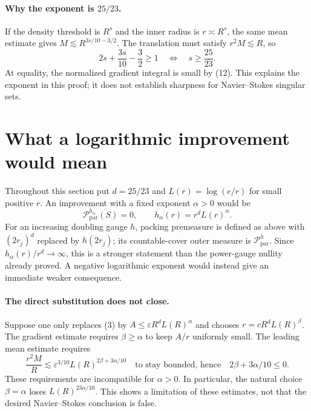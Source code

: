 \documentclass[11pt]{article}
\begin{document}
\paragraph{Why the exponent is $25/23$.}
If the density threshold is $R^s$ and the inner radius is $r\asymp R^s$, the same mean estimate gives $M\lesssim R^{3s/10-3/2}$. The translation must satisfy $r^2M\lesssim R$, so
$$
2s+\frac{3s}{10}-\frac32\ge1
\quad\Longleftrightarrow\quad s\ge\frac{25}{23}.
$$
At equality, the normalized gradient integral is small by (12). This explains the exponent in this proof; it does not establish sharpness for Navier--Stokes singular sets.

\section{What a logarithmic improvement would mean}
Throughout this section put $d=25/23$ and $L(r)=\log(e/r)$ for small positive $r$. An improvement with a fixed exponent $\alpha>0$ would be
$$
\mathcal P^{h_\alpha}_{\mathrm{par}}(S)=0,
\qquad h_\alpha(r)=r^dL(r)^\alpha.
$$
For an increasing doubling gauge $h$, packing premeasure is defined as above with $(2r_j)^d$ replaced by $h(2r_j)$; its countable-cover outer measure is $\mathcal P^h_{\mathrm{par}}$. Since $h_\alpha(r)/r^d\to\infty$, this is a stronger statement than the power-gauge nullity already proved. A negative logarithmic exponent would instead give an immediate weaker consequence.

\paragraph{The direct substitution does not close.}
Suppose one only replaces (3) by $A\le\varepsilon R^dL(R)^\alpha$ and chooses $r=cR^dL(R)^\beta$. The gradient estimate requires $\beta\ge\alpha$ to keep $A/r$ uniformly small. The leading mean estimate requires
$$
\frac{r^2M}{R}\lesssim\varepsilon^{3/10}L(R)^{2\beta+3\alpha/10}
\quad\text{to stay bounded, hence}\quad
2\beta+3\alpha/10\le0.
$$
These requirements are incompatible for $\alpha>0$. In particular, the natural choice $\beta=\alpha$ loses $L(R)^{23\alpha/10}$. This shows a limitation of these estimates, not that the desired Navier--Stokes conclusion is false.
\end{document}
